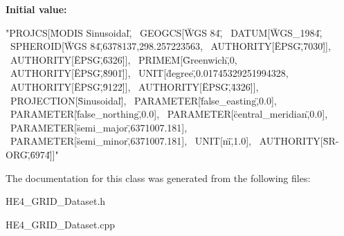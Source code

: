 \label{classHE4__GRID__Dataset_ab96a75584a7775cc29c52b3004a31d3e}
{\bfseries Initial value:}
\begin{DoxyCode}
"PROJCS[\"MODIS Sinusoidal\", \
    GEOGCS[\"WGS 84\", \
        DATUM[\"WGS_1984\", \
            SPHEROID[\"WGS 84\",6378137,298.257223563, \
                AUTHORITY[\"EPSG\",\"7030\"]], \
            AUTHORITY[\"EPSG\",\"6326\"]], \
        PRIMEM[\"Greenwich\",0, \
            AUTHORITY[\"EPSG\",\"8901\"]], \
        UNIT[\"degree\",0.01745329251994328, \
            AUTHORITY[\"EPSG\",\"9122\"]], \
        AUTHORITY[\"EPSG\",\"4326\"]], \
    PROJECTION[\"Sinusoidal\"], \
    PARAMETER[\"false_easting\",0.0], \
    PARAMETER[\"false_northing\",0.0], \
    PARAMETER[\"central_meridian\",0.0], \
    PARAMETER[\"semi_major\",6371007.181], \
    PARAMETER[\"semi_minor\",6371007.181], \
    UNIT[\"m\",1.0], \
    AUTHORITY[\"SR-ORG\",\"6974\"]]"
\end{DoxyCode}


The documentation for this class was generated from the following files:\begin{DoxyCompactItemize}
\item 
HE4\_\-GRID\_\-Dataset.h\item 
HE4\_\-GRID\_\-Dataset.cpp\end{DoxyCompactItemize}
